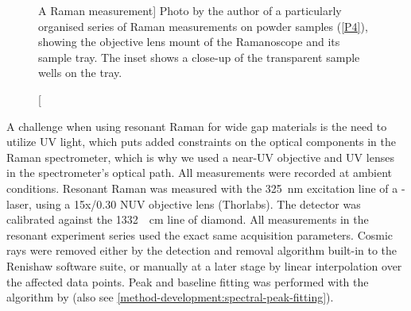 \documentclass[draft,webedition,openright,titles,swedish,english]{LuaUUThesis}\usepackage[]{graphicx}\usepackage[]{xcolor}
\begin{document}
%

\begin{figure}[tbp]
\centering
{}
\caption%
[A Raman measurement]{%
   Photo by the author of a particularly organised series of Raman measurements on \zincox{}
   powder samples (\cref{P4}), showing the objective lens mount of the Ramanoscope and its sample tray.
   The inset shows a close-up of the transparent sample wells on the tray.
}
\label{fig:0403-raman-setup}
\end{figure}

A challenge when using resonant Raman for wide gap materials
is the need to utilize \gls{UV} light, which puts added constraints on the
optical components in the Raman spectrometer, which is why
we used a near-UV objective and \gls{UV} lenses in the spectrometer's
optical path. All measurements were recorded at ambient conditions.
Resonant Raman was measured with the \qty{325}{\nm} excitation line of a - laser,
using a 15x/0.30 NUV objective lens (Thorlabs).
The detector was calibrated against the \qty{1332}{\per\cm} line of diamond.
All measurements in the resonant experiment series used the exact same acquisition
parameters.
Cosmic rays were removed either by the detection and removal algorithm
built-in to the Renishaw software suite, or manually at a later stage by
linear interpolation over the affected data points.
Peak and baseline fitting was performed with the algorithm by \textcite{Davies2008}
(also see \cref{method-development:spectral-peak-fitting}).
\end{document}
